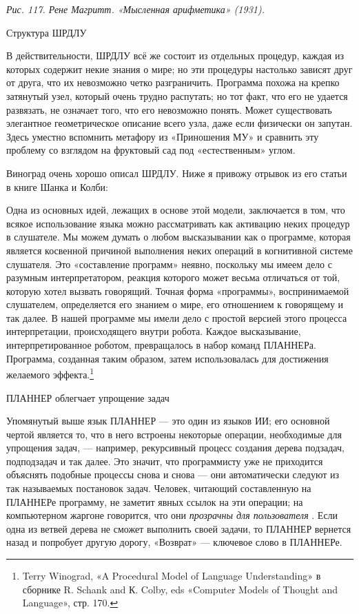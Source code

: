 \documentclass[../main.tex]{subfiles}
\begin{document}
\emph{Рис. 117. Рене Магритт. «Мысленная арифметика» (1931).}

Структура ШРДЛУ

В действительности, ШРДЛУ всё же состоит из отдельных процедур, каждая из которых содержит некие знания о мире; но эти процедуры настолько зависят друг от друга, что их невозможно четко разграничить. Программа похожа на крепко затянутый узел, который очень трудно распутать; но тот факт, что его не удается развязать, не означает того, что его невозможно понять. Может существовать элегантное геометрическое описание всего узла, даже если физически он запутан. Здесь уместно вспомнить метафору из «Приношения МУ» и сравнить эту проблему со взглядом на фруктовый сад под «естественным» углом.

Виноград очень хорошо описал ШРДЛУ. Ниже я привожу отрывок из его статьи в книге Шанка и Колби:

Одна из основных идей, лежащих в основе этой модели, заключается в том, что всякое использование языка можно рассматривать как активацию неких процедур в слушателе. Мы можем думать о любом высказывании как о программе, которая является косвенной причиной выполнения неких операций в когнитивной системе слушателя. Это «составление программ» неявно, поскольку мы имеем дело с разумным интерпретатором, реакция которого может весьма отличаться от той, которую хотел вызвать говорящий. Точная форма «программы», воспринимаемой слушателем, определяется его знанием о мире, его отношением к говорящему и так далее. В нашей программе мы имели дело с простой версией этого процесса интерпретации, происходящего внутри робота. Каждое высказывание, интерпретированное роботом, превращалось в набор команд ПЛАННЕРа. Программа, созданная таким образом, затем использовалась для достижения желаемого эффекта.\footnote{Terry Winograd, «A Procedural Model of Language Understanding» в сборнике R. Schank and К. Colby, eds «Computer Models of Thought and Language», стр. 170.}

ПЛАННЕР облегчает упрощение задач

Упомянутый выше язык ПЛАННЕР --- это один из языков ИИ; его основной чертой является то, что в него встроены некоторые операции, необходимые для упрощения задач, --- например, рекурсивный процесс создания дерева подзадач, подподзадач и так далее. Это значит, что программисту уже не приходится объяснять подобные процессы снова и снова --- они автоматически следуют из так называемых постановок задач. Человек, читающий составленную на ПЛАННЕРе программу, не заметит явных ссылок на эти операции; на компьютерном жаргоне говорится, что они \emph{прозрачны для пользователя} . Если одна из ветвей дерева не сможет выполнить своей задачи, то ПЛАННЕР вернется назад и попробует другую дорогу, «Возврат» --- ключевое слово в ПЛАННЕРе.
\end{document}
